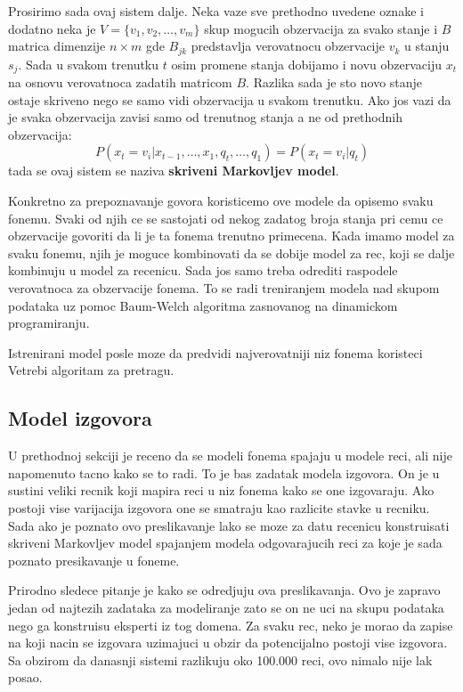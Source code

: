\documentclass[a4paper]{article}
\begin{document}
Prosirimo sada ovaj sistem dalje. Neka vaze sve prethodno uvedene oznake i dodatno neka je $V = \{v_1, v_2, \dots, v_m\}$ skup mogucih obzervacija za svako stanje i $B$ matrica dimenzije $n \times m$ gde $B_{jk}$ predstavlja verovatnocu obzervacije $v_k$ u stanju $s_j$.
Sada u svakom trenutku $t$ osim promene stanja dobijamo i novu obzervaciju $x_t$ na osnovu verovatnoca zadatih matricom $B$.
Razlika sada je sto novo stanje ostaje skriveno nego se samo vidi obzervacija u svakom trenutku.
Ako jos vazi da je svaka obzervacija zavisi samo od trenutnog stanja a ne od prethodnih obzervacija:
$$P(x_t = v_i | x_{t-1}, \dots, x_1, q_t, \dots, q_1) = P(x_t = v_i | q_t)$$
tada se ovaj sistem se naziva \textbf{skriveni Markovljev model}.

Konkretno za prepoznavanje govora koristicemo ove modele da opisemo svaku fonemu.
Svaki od njih ce se sastojati od nekog zadatog broja stanja pri cemu ce obzervacije govoriti da li je ta fonema trenutno primecena.
Kada imamo model za svaku fonemu, njih je moguce kombinovati da se dobije model za rec, koji se dalje kombinuju u model za recenicu.
Sada jos samo treba odrediti raspodele verovatnoca za obzervacije fonema. 
To se radi treniranjem modela nad skupom podataka uz pomoc Baum-Welch algoritma zasnovanog na dinamickom programiranju.

Istrenirani model posle moze da predvidi najverovatniji niz fonema koristeci Vetrebi algoritam za pretragu.

\subsection{Model izgovora}
U prethodnoj sekciji je receno da se modeli fonema spajaju u modele reci, ali nije napomenuto tacno kako se to radi.
To je bas zadatak modela izgovora.
On je u sustini veliki recnik koji mapira reci u niz fonema kako se one izgovaraju.
Ako postoji vise varijacija izgovora one se smatraju kao razlicite stavke u recniku.
Sada ako je poznato ovo preslikavanje lako se moze za datu recenicu konstruisati skriveni Markovljev model spajanjem modela odgovarajucih reci za koje je sada poznato presikavanje u foneme.

Prirodno sledece pitanje je kako se odredjuju ova preslikavanja. 
Ovo je zapravo jedan od najtezih zadataka za modeliranje zato se on ne uci na skupu podataka nego ga konstruisu eksperti iz tog domena.
Za svaku rec, neko je morao da zapise na koji nacin se izgovara uzimajuci u obzir da potencijalno postoji vise izgovora.
Sa obzirom da danasnji sistemi razlikuju oko 100.000 reci, ovo nimalo nije lak posao.
\end{document}
